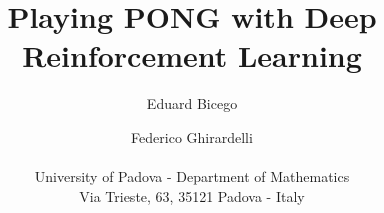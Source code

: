 \documentclass[letterpaper]{article} %
\begin{document}
%
\title{Playing PONG with Deep Reinforcement Learning}

\author{Eduard Bicego \and Federico Ghirardelli\\\\
University of Padova - Department of Mathematics\\
Via Trieste, 63, 35121 Padova - Italy\\
}

\maketitle









\end{document}
